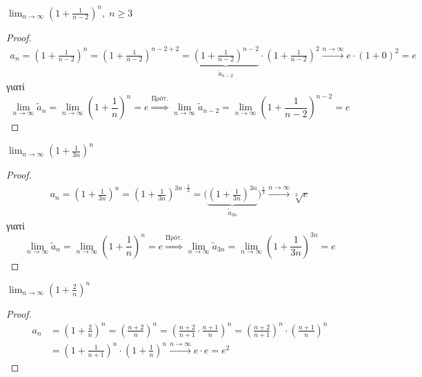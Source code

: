     \begin{enumerate}[i)]
      \item $ \lim_{n \to \infty} \left(1+ \frac{1}{n-2} \right)^{n}, \; n 
        \geq 3 $
        \begin{proof}
        \item {}
          \begin{align*}
            a_{n} = \left(1+ \frac{1}{n-2} \right)^{n} = \left(1+ 
            \frac{1}{n-2} \right)^{n-2+2} = 
            \underbrace{\left(1+ \frac{1}{n-2} 
              \right)^{n-2}}_{\tilde{a} _{n-2}} \cdot \left(1 + 
              \frac{1}{n-2} 
            \right)^{2} \xrightarrow{n \to \infty} e \cdot (1+0)^{2} = e
          \end{align*}
          γιατί
          \[
            \lim_{n \to \infty} \tilde{a} _{n} = \lim_{n \to \infty} 
            \left(1+ \frac{1}{n}\right)^{n} = e 
            \overset{\text{Πρότ.}}{\Rightarrow} 
            \lim_{n \to \infty} \tilde{a} _{n-2} = \lim_{n \to \infty} 
            \left(1+ \frac{1}{n-2} \right)^{n-2} = e
          \] 
        \end{proof}

      \item $ \lim_{n \to \infty} \left(1 + \frac{1}{3n} \right)^{n} $
        \begin{proof}
        \item {}
          \begin{align*}
            a_{n}= \left(1+ \frac{1}{3n} \right)^{n} = \left(1+ 
            \frac{1}{3n} \right)
            ^{3n\cdot \frac{1}{3}} = \Biggl(\underbrace{\left(1+ 
              \frac{1}{3n} \right)^{3n}}_{\tilde{a} _{3n}}
            \Biggr)^{\frac{1}{3}} \xrightarrow{n \to \infty} \sqrt[3]{e} 
          \end{align*}
          γιατί
          \[
            \lim_{n \to \infty} \tilde{a} _{n} = \lim_{n \to \infty} 
            \left(1+ \frac{1}{n}\right)^{n} = e 
            \overset{\text{Πρότ.}}{\Rightarrow} 
            \lim_{n \to \infty} \tilde{a} _{3n} = \lim_{n \to \infty} 
            \left(1+ \frac{1}{3n} \right)^{3n} = e
          \]
        \end{proof}

      \item $ \lim_{n \to \infty} \left(1+ \frac{2}{n} \right)^{n} $
        \begin{proof}
        \item {}
          \begin{align*}
            a_{n} &= \left(1+ \frac{2}{n} \right)^{n} = \left(\frac{n+2}{n} 
            \right)^{n} = \left( \frac{n+2}{n+1} \cdot \frac{n+1}{n}\right)^{n} =
            \left(\frac{n+2}{n+1} \right)^{n} \cdot \left(\frac{n+1}{n} \right)^{n} \\
                  &= \left(1 + \frac{1}{n+1} \right)^{n} \cdot \left(1+ \frac{1}{n} 
                  \right)^{n} \xrightarrow{n \to \infty}  e \cdot e = e^{2}
            \end{align*}  
          \end{proof}


\end{enumerate}
